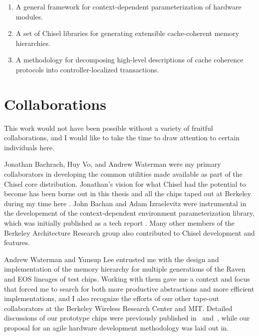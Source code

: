\begin{enumerate}
\item A general framework for context-dependent parameterization of hardware modules.
\item A set of Chisel libraries for generating extensible cache-coherent memory hierarchies.
\item A methodology for decomposing high-level descriptions of cache coherence protocols into controller-localized transactions.
\end{enumerate}

\section{Collaborations}

This work would not have been possible without a variety of fruitful collaborations, and I would like to take the time to draw attention to certain individuals here.

Jonathan Bachrach, Huy Vo, and Andrew Waterman were my primary collaborators in developing the common utilities made available as part of the Chisel core distribution.
Jonathan's vision for what Chisel had the potential to become has been borne out in this thesis and all the chips taped out at Berkeley during my time here \cite{chisel}.
John Bachan and Adam Izraelevitz were instrumental in the developement of the context-dependent environment parameterization library,
which was initially published as a tech report \cite{cdeTR}.
Many other members of the Berkeley Architecture Research group also contributed to Chisel development and features. 

Andrew Waterman and Yunsup Lee entrusted me with the design and implementation of the memory hierarchy for multiple generations of the Raven and EOS lineages of test chips.
Working with them gave me a context and focus that forced me to search for both more productive abstractions and more efficient implementations,
and I also recognize the efforts of our other tape-out collaborators at the Berkeley Wireless Research Center and MIT.
Detailed discussions of our prototype chips were previously published
in~\cite{lee2014eos} and~\cite{zimmer2015raven},
while our proposal for an agile hardware development methodology was laid out in\cite{lee-micro15}.
